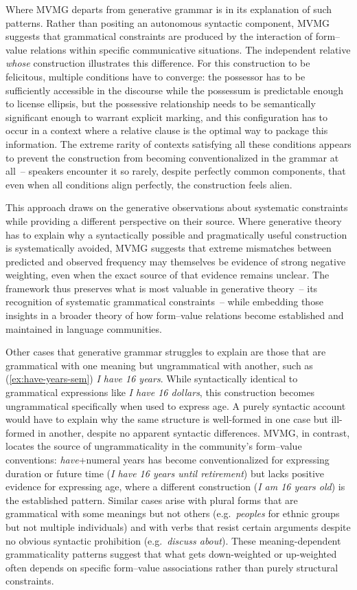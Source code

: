 \documentclass[12pt,letterpaper]{article}
\newcommand{\mention}[1]{\textit{#1}}
\begin{document}
Where MVMG departs from generative grammar is in its explanation of such patterns. Rather than positing an autonomous syntactic component, MVMG suggests that grammatical constraints are produced by the interaction of form--value relations within specific communicative situations. The independent relative \mention{whose} construction illustrates this difference. For this construction to be felicitous, multiple conditions have to converge: the possessor has to be sufficiently accessible in the discourse while the possessum is predictable enough to license ellipsis, but the possessive relationship needs to be semantically significant enough to warrant explicit marking, and this configuration has to occur in a context where a relative clause is the optimal way to package this information. The extreme rarity of contexts satisfying all these conditions appears to prevent the construction from becoming conventionalized in the grammar at all~-- speakers encounter it so rarely, despite perfectly common components, that even when all conditions align perfectly, the construction feels alien.

This approach draws on the generative observations about systematic constraints while providing a different perspective on their source. Where generative theory has to explain why a syntactically possible and pragmatically useful construction is systematically avoided, MVMG suggests that extreme mismatches between predicted and observed frequency may themselves be evidence of strong negative weighting, even when the exact source of that evidence remains unclear. The framework thus preserves what is most valuable in generative theory~-- its recognition of systematic grammatical constraints~-- while embedding those insights in a broader theory of how form--value relations become established and maintained in language communities.

Other cases that generative grammar struggles to explain are those that are grammatical with one meaning but ungrammatical with another, such as (\ref{ex:have-years-sem}) \textit{I have 16 years}. While syntactically identical to grammatical expressions like \mention{I have 16 dollars}, this construction becomes ungrammatical specifically when used to express age. A purely syntactic account would have to explain why the same structure is well-formed in one case but ill-formed in another, despite no apparent syntactic differences. MVMG, in contrast, locates the source of ungrammaticality in the community's form--value conventions: \mention{have}+numeral years has become conventionalized for expressing duration or future time (\textit{I have 16 years until retirement}) but lacks positive evidence for expressing age, where a different construction (\textit{I am 16 years old}) is the established pattern. Similar cases arise with plural forms that are grammatical with some meanings but not others (e.g.\, \mention{peoples} for ethnic groups but not multiple individuals) and with verbs that resist certain arguments despite no obvious syntactic prohibition (e.g.\, \mention{discuss about}). These meaning-dependent grammaticality patterns suggest that what gets down-weighted or up-weighted often depends on specific form--value associations rather than purely structural constraints.
\end{document}
